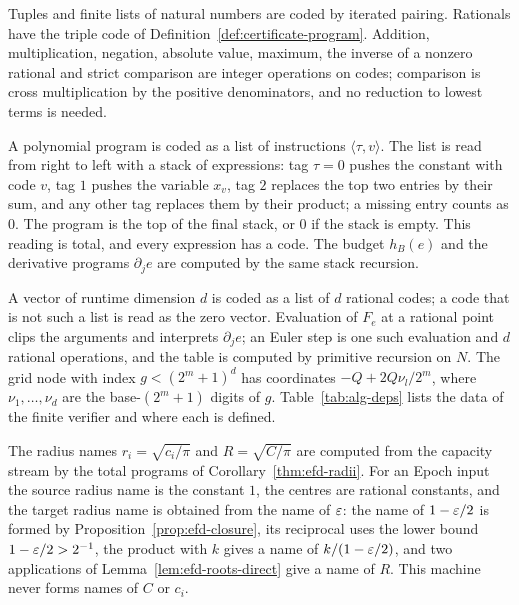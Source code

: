 Tuples and finite lists of natural numbers are coded by iterated pairing. Rationals have the triple code of
Definition~\ref{def:certificate-program}. Addition, multiplication, negation, absolute value, maximum, the inverse of a
nonzero rational and strict comparison are integer operations on codes; comparison is cross multiplication by the
positive denominators, and no reduction to lowest terms is needed.

A polynomial program is coded as a list of instructions $\langle\tau,v\rangle$. The list is read from right to left with
a stack of expressions: tag $\tau=0$ pushes the constant with code $v$, tag $1$ pushes the variable $x_v$, tag $2$
replaces the top two entries by their sum, and any other tag replaces them by their product; a missing entry counts
as $0$. The program is the top of the final stack, or $0$ if the stack is empty. This reading is total, and every
expression has a code. The budget $h_B(e)$ and the derivative programs $\partial_je$ are computed by the same stack
recursion.

A vector of runtime dimension $d$ is coded as a list of $d$ rational codes; a code that is not such a list is read
as the zero vector. Evaluation of $F_e$ at a rational point clips the arguments and interprets $\partial_je$; an Euler
step is one such evaluation and $d$ rational operations, and the table is computed by primitive recursion on $N$.
The grid node with index $g<(2^m+1)^d$ has coordinates $-Q+2Q\nu_l/2^m$, where $\nu_1,\dots,\nu_d$ are the base-$(2^m+1)$
digits of $g$. Table~\ref{tab:alg-deps} lists the data of the finite verifier and where each is defined.

The radius names $r_i=\sqrt{c_i/\pi}$ and $R=\sqrt{C/\pi}$ are computed from the capacity stream by the total programs
of Corollary~\ref{thm:efd-radii}. For an Epoch input the source radius name is the constant $1$, the centres are
rational constants, and the target radius name is obtained from the name of $\varepsilon$: the name of $1-\varepsilon/2$ is formed
by Proposition~\ref{prop:efd-closure}, its reciprocal uses the lower bound $1-\varepsilon/2>2^{-1}$, the product with $k$
gives a name of $k/(1-\varepsilon/2)$, and two applications of Lemma~\ref{lem:efd-roots-direct} give a name of $R$. This
machine never forms names of $C$ or $c_i$.


